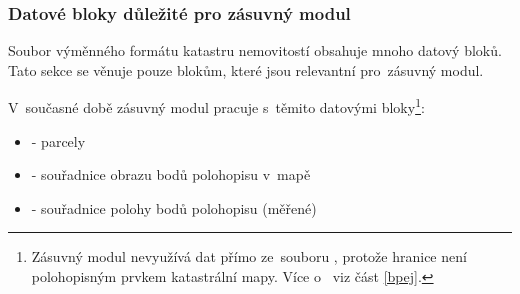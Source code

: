 \subsubsection{Datové bloky důležité pro zásuvný modul}
\label{datove_bloky_zasuvny_modul}

Soubor výměnného formátu katastru nemovitostí obsahuje mnoho datový
bloků. Tato sekce se věnuje pouze blokům, které jsou relevantní
pro~zásuvný modul.

V~současné době zásuvný modul pracuje s~těmito datovými
bloky\footnote{Zásuvný modul nevyužívá dat  přímo ze~souboru
, protože hranice  není polohopisným prvkem
katastrální mapy. Více o~ viz část \ref{bpej}.}:

	\begin{itemize}[leftmargin=1.5cm, noitemsep]
		\item \texttt{} - parcely
		\item \texttt{} - souřadnice obrazu bodů
polohopisu v~mapě
		\item \texttt{} - souřadnice polohy bodů
polohopisu (měřené)
	\end{itemize}

